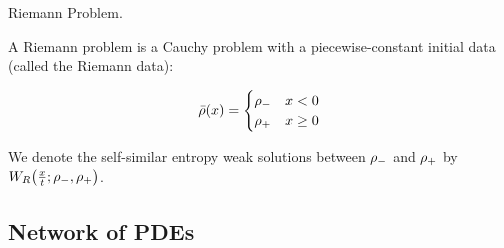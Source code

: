 %
%
%
%
%
\begin{defn}
\label{def:Riemann-Problem}Riemann Problem.

A Riemann problem is a Cauchy problem with a piecewise-constant initial data (called the Riemann data):

\[
\bar{\rho}(x)=\begin{cases}
\rho_{-} & x<0\\
\rho_{+} & x\ge 0
\end{cases}
\]
\end{defn}
We denote the self-similar entropy weak solutions between $\rho_{-}$ and $\rho_{+}$ by $\ss{\frac{x}{t}}{\cvar_{-}}{\cvar_{+}}$.


\subsection{Network of PDEs\label{sub:Network-of-PDE's}}

